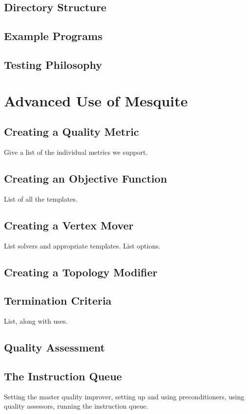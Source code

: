 \subsection{Directory Structure}

\subsection{Example Programs}

\subsection{Testing Philosophy}

\section{Advanced Use of Mesquite}

\subsection{Creating a Quality Metric}
Give a list of the individual metrics we support.

\subsection{Creating an Objective Function}
List of all the templates.

\subsection{Creating a Vertex Mover}
List solvers and appropriate templates. List options.

\subsection{Creating a Topology Modifier}

\subsection{Termination Criteria}
List, along with uses.

\subsection{Quality Assessment}

\subsection{The Instruction Queue}
Setting the master quality improver, setting up and using preconditioners,
using quality assessors, running the instruction queue.

